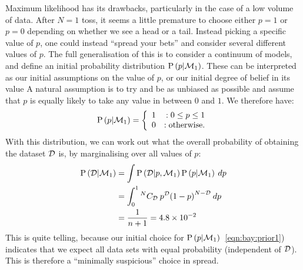 Maximum likelihood has its drawbacks, particularly in the case of a low volume of data. After $N=1$ toss, it seems a little premature to choose either $p=1$ or $p=0$ depending on whether we see a head or a tail. Instead picking a specific value of $p$, one could instead ``spread your bets'' and consider several different values of $p$. The full generalisation of this is to consider a continuum of models, and define an initial probability distribution $\mathrm{P}\left(p\middle|\mathcal{M}_1\right)$. These can be interpreted as our initial assumptions on the value of $p$, or our initial degree of belief in its value
A natural assumption is to try and be as unbiased as possible and assume that $p$ is equally likely to take any value in between $0$ and $1$. We therefore have:
\begin{equation}
  \mathrm{P}\left(p\middle|\mathcal{M}_1\right)=\left\{
  \begin{array}{lr}
    1 &:0\le p\le1\\
    0 &:\text{otherwise.}\\
  \end{array}
  \right.\label{eqn:bay:prior1}
\end{equation}
With this distribution, we can work out what the overall probability of obtaining the dataset $\mathcal{D}$ is, by marginalising over all values of $p$:
\begin{align}
  \mathrm{P}\left(\mathcal{D}\middle|\mathcal{M}_1\right) 
  &= \int \mathrm{P}\left(\mathcal{D}\middle|p,\mathcal{M}_1\right)\mathrm{P}\left(p\middle|\mathcal{M}_1\right)\: dp \\
  &= \int_0^1 {^{N}C_{\mathcal{D}}}\: {p}^{\mathcal{D}} {\left(1 - p \right)}^{N-\mathcal{D}}\: dp \\
  &= \frac{1}{n+1} = 4.8\times10^{-2}
  \label{eqn:bay:marg}
\end{align}
This is quite telling, because our initial choice for $\mathrm{P}\left(p\middle|\mathcal{M}_1\right)$~\ref{eqn:bay:prior1}) indicates that we expect all data sets with equal probability (independent of $\mathcal{D}$). This is therefore a ``minimally suspicious'' choice in spread.

